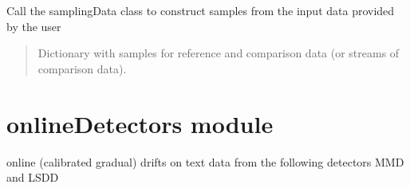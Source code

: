 \documentclass[letterpaper,10pt,english]{sphinxmanual}
\begin{document}
\begin{fulllineitems}
\begin{fulllineitems}
\label{\detokenize{alibiModules/basicDetectors:basicDetectors.basicDetectors.run_all}}
\pysigstartsignatures
{}
\pysigstopsignatures
\end{fulllineitems}


\begin{fulllineitems}
\label{\detokenize{alibiModules/basicDetectors:basicDetectors.basicDetectors.sampleData}}
\pysigstartsignatures
{}
\pysigstopsignatures
\sphinxAtStartPar
Call the samplingData class to construct samples from the input data provided by the user
\begin{quote}\begin{description}
\sphinxAtStartPar
Dictionary with samples for reference and comparison data (or streams of comparison data).

\end{description}\end{quote}

\end{fulllineitems}


\end{fulllineitems}


\sphinxstepscope


\section{onlineDetectors module}
\label{\detokenize{alibiModules/onlineDetectors:module-onlineDetectors}}\label{\detokenize{alibiModules/onlineDetectors:onlinedetectors-module}}\label{\detokenize{alibiModules/onlineDetectors::doc}}
\sphinxAtStartPar
online (calibrated gradual) drifts on text data from the following detectors \sphinxhyphen{} MMD and LSDD
\end{document}
